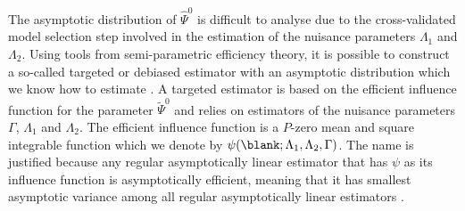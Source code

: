 The asymptotic distribution of \( \hat{\Psi}^0 \) is
difficult to analyse due to the cross-validated model selection step
involved in the estimation of the nuisance parameters $\Lambda_1$ and
$\Lambda_2$.
Using tools from semi-parametric efficiency theory, it is possible to
construct a so-called targeted or debiased estimator with an
asymptotic distribution which we know how to estimate
\citep{bickel1993efficient,van2011targeted,chernozhukov2018double}. A
targeted estimator is based on the efficient influence function for
the parameter $\tilde{\Psi}^0$ and relies on estimators of the
nuisance parameters $\Gamma$, \( \Lambda_1 \) and $\Lambda_2$. The
efficient influence function is a \( P \)-zero mean and square
integrable function which we denote by
\( \psi(\blank ; \Lambda_1, \Lambda_2, \Gamma) \). The name is
justified because any regular asymptotically linear estimator that has
\( \psi \) as its influence function is asymptotically efficient,
meaning that it has smallest asymptotic variance among all regular
asymptotically linear estimators \citep{bickel1993efficient}.

